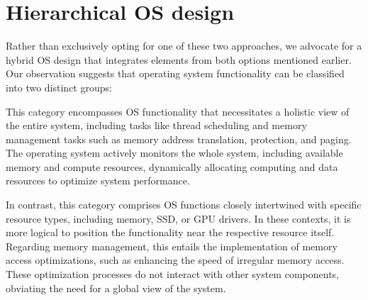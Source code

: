 \section{Hierarchical OS design}

Rather than exclusively opting for one of these two approaches, we advocate for a hybrid OS design that integrates elements from both options mentioned earlier. Our observation suggests that operating system functionality can be classified into two distinct groups:

 This category encompasses OS functionality that necessitates a holistic view of the entire system, including tasks like thread scheduling and memory management tasks such as memory address translation, protection, and paging. The operating system actively monitors the whole system, including available memory and compute resources, dynamically allocating computing and data resources to optimize system performance.

 In contrast, this category comprises OS functions closely intertwined with specific resource types, including memory, SSD, or GPU drivers. In these contexts, it is more logical to position the functionality near the respective resource itself. Regarding memory management, this entails the implementation of memory access optimizations, such as enhancing the speed of irregular memory access. These optimization processes do not interact with other system components, obviating the need for a global view of the system.
